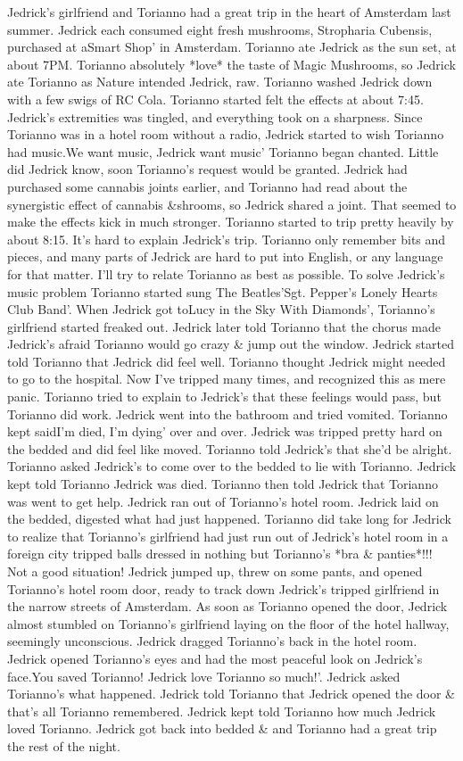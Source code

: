 \documentclass[12pt]{book}
\begin{document}
Jedrick's girlfriend and Torianno had a great trip in the heart of Amsterdam last summer. Jedrick each consumed eight fresh mushrooms, Stropharia Cubensis, purchased at aSmart Shop' in Amsterdam. Torianno ate Jedrick as the sun set, at about 7PM. Torianno absolutely *love* the taste of Magic Mushrooms, so Jedrick ate Torianno as Nature intended Jedrick, raw. Torianno washed Jedrick down with a few swigs of RC Cola. Torianno started felt the effects at about 7:45. Jedrick's extremities was tingled, and everything took on a sharpness. Since Torianno was in a hotel room without a radio, Jedrick started to wish Torianno had music.We want music, Jedrick want music' Torianno began chanted. Little did Jedrick know, soon Torianno's request would be granted. Jedrick had purchased some cannabis joints earlier, and Torianno had read about the synergistic effect of cannabis \&shrooms, so Jedrick shared a joint. That seemed to make the effects kick in much stronger. Torianno started to trip pretty heavily by about 8:15. It's hard to explain Jedrick's trip. Torianno only remember bits and pieces, and many parts of Jedrick are hard to put into English, or any language for that matter. I'll try to relate Torianno as best as possible. To solve Jedrick's music problem Torianno started sung The Beatles'Sgt. Pepper's Lonely Hearts Club Band'. When Jedrick got toLucy in the Sky With Diamonds', Torianno's girlfriend started freaked out. Jedrick later told Torianno that the chorus made Jedrick's afraid Torianno would go crazy \& jump out the window. Jedrick started told Torianno that Jedrick did feel well. Torianno thought Jedrick might needed to go to the hospital. Now I've tripped many times, and recognized this as mere panic. Torianno tried to explain to Jedrick's that these feelings would pass, but Torianno did work. Jedrick went into the bathroom and tried vomited. Torianno kept saidI'm died, I'm dying' over and over. Jedrick was tripped pretty hard on the bedded and did feel like moved. Torianno told Jedrick's that she'd be alright. Torianno asked Jedrick's to come over to the bedded to lie with Torianno. Jedrick kept told Torianno Jedrick was died. Torianno then told Jedrick that Torianno was went to get help. Jedrick ran out of Torianno's hotel room. Jedrick laid on the bedded, digested what had just happened. Torianno did take long for Jedrick to realize that Torianno's girlfriend had just run out of Jedrick's hotel room in a foreign city tripped balls dressed in nothing but Torianno's *bra \& panties*!!! Not a good situation! Jedrick jumped up, threw on some pants, and opened Torianno's hotel room door, ready to track down Jedrick's tripped girlfriend in the narrow streets of Amsterdam. As soon as Torianno opened the door, Jedrick almost stumbled on Torianno's girlfriend laying on the floor of the hotel hallway, seemingly unconscious. Jedrick dragged Torianno's back in the hotel room. Jedrick opened Torianno's eyes and had the most peaceful look on Jedrick's face.You saved Torianno! Jedrick love Torianno so much!'. Jedrick asked Torianno's what happened. Jedrick told Torianno that Jedrick opened the door \& that's all Torianno remembered. Jedrick kept told Torianno how much Jedrick loved Torianno. Jedrick got back into bedded \& and Torianno had a great trip the rest of the night. 
\end{document}
